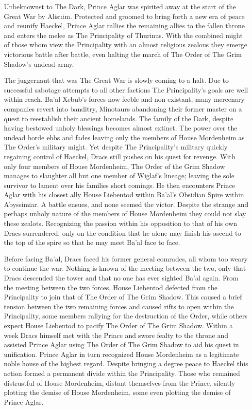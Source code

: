 \begin{multicols}{2}
Unbeknownst to The Dark, Prince Aglar was spirited away at the start of the Great War by Alisuim. Protected and groomed to bring forth a new era of peace and reunify Haeckel, Prince Aglar rallies the remaining allies to the fallen throne and enters the melee as The Principality of Thurinus. With the combined might of those whom view the Principality with an almost religious zealous they emerge victorious battle after battle, even halting the march of The Order of The Grim Shadow’s undead army.

The juggernaut that was The Great War is slowly coming to a halt. Due to successful sabotage attempts to all other factions The Principality’s goals are well within reach. Ba’al Xebub’s forces now feeble and non existant, many mercenary companies revert into banditry, Minotaurs abandoning their former master on a quest to reestablish their ancient homelands. The family of the Dark, despite having bestowed unholy blessings becomes almost extinct. The power over the undead horde ebbs and fades leaving only the members of House Mordenheim as The Order’s military might.
Yet despite The Principality’s military quickly regaining control of Haeckel, Dracs still pushes on his quest for revenge. With only four members of House Mordenheim, The Order of the Grim Shadow manages to slaughter all but one member of Wiglaf’s lineage; leaving the sole survivor to lament over his families short comings. He then encounters Prince Aglar with his closest ally House Liebentod within Ba’al’s Obsidian Spire within Abyssimiar. A battle ensues, and none seemed the victor. Despite the strange and perhaps unholy nature of the members of House Mordenheim they could not slay these zealots. Recognizing the passion within his opposition to that of his own Dracs surrendered, only on the condition that he alone may finish his ascend to the top of the spire so that he may meet Ba’al face to face.

Before facing Ba’al, Dracs faced his former general comrades, all whom too weary to continue the war. Nothing is known of the meeting between the two, only that Dracs descended the tower and that no one has ever sighted Ba’al again. From the meeting between the two forces, House Liebentod defected from the Principality to join that of The Order of The Grim Shadow. This caused a brief tension between the two remaining forces and caused rifts to open within the Principality, some members rallying for the destruction of the Order, while others expect House Liebentod to pacify The Order of The Grim Shadow. Within a week Dracs himself met with the Prince and swore fealty to the throne and assisted Prince Aglar using The Order of The Grim Shadow to aid his quest in unification. Prince Aglar in turn recognized House Mordenheim as a legitimate noble house of the highest regard. Despite bringing a degree peace to Haeckel this action formed a permanent divide within the Principality. Those who remained distrustful of House Mordenheim, distant themselves from the Prince, silently plotting the demise of House Mordenheim, some even plotting the demise of Prince Aglar.


\end{multicols}
